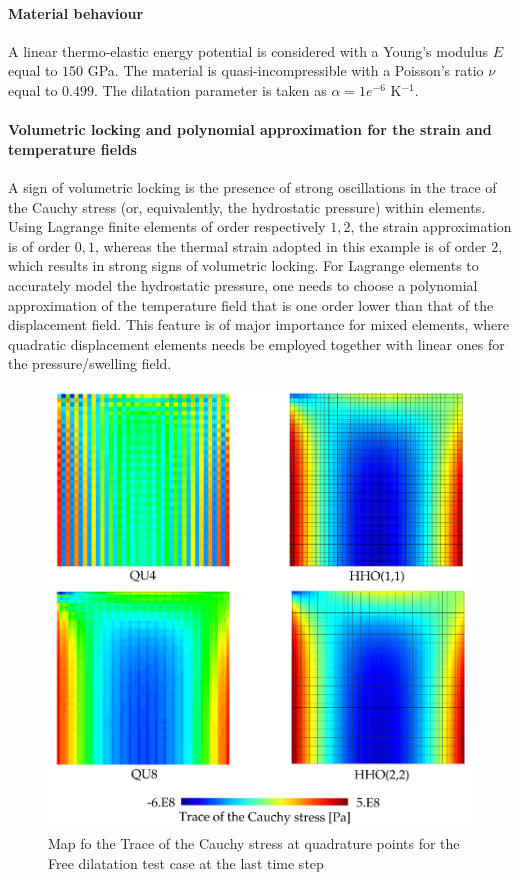 \paragraph{Material behaviour}

A linear thermo-elastic energy potential is considered with a Young's
modulus $E$ equal to $150$ GPa. The material is quasi-incompressible
with a Poisson's ratio $\nu$ equal to $0.499$. The dilatation parameter
is taken as $\alpha = 1e^{-6}$ K$^{-1}$.

\paragraph{Volumetric locking and polynomial approximation for the strain and temperature fields}

A sign of volumetric locking is the presence of strong oscillations in the trace of the Cauchy stress (or, equivalently, the hydrostatic pressure) within elements.
Using Lagrange finite elements of order respectively $1, 2$, the
strain approximation is of order $0, 1$, whereas the thermal
strain adopted in this example is of order $2$, which results in strong signs of volumetric locking. For Lagrange
elements to accurately model the hydrostatic pressure, one needs to choose a polynomial approximation of the temperature field that is one order lower than that of the
displacement field. This feature is of major importance for mixed
elements, where quadratic displacement elements needs be employed together with linear ones for the pressure/swelling field.

\begin{figure}[H]
    \centering
    \includegraphics[width=10.cm]{../chapter_01_hho_mechanics/figures/satoh_calc.png}
    \caption{Map fo the Trace of the Cauchy stress at quadrature points for the Free dilatation test case at the last time step}
    \label{fig_satoh_calc}
\end{figure}

